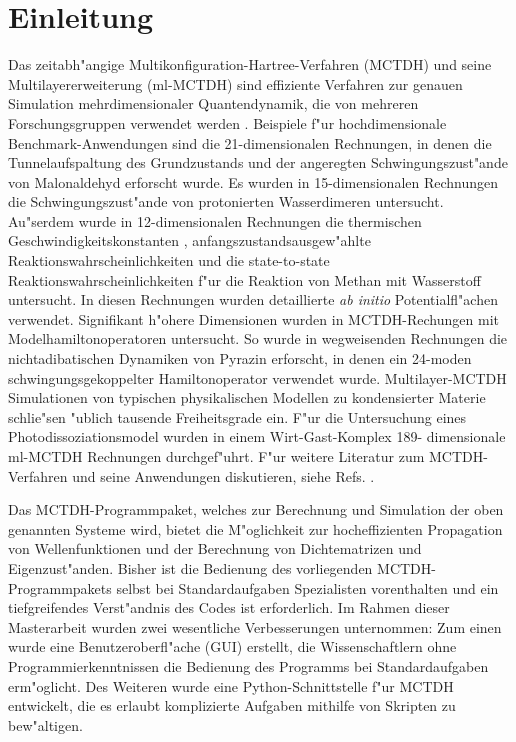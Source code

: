 \chapter{Einleitung}
\label{ch:einleitung}

Das zeitabh"angige Multikonfiguration-Hartree-Verfahren (MCTDH) 
\cite{MMC, MMC1} und seine Multilayererweiterung (ml-MCTDH)
\cite{WT3, Mreview2} 
sind effiziente Verfahren zur genauen Simulation mehrdimensionaler Quantendynamik,
die von mehreren Forschungsgruppen verwendet werden 
\cite{MCTDHex1, WestPNM, MCTDHex2, W1, MCTDHex4, MCTDHex5, MCTDHex6, MCTDHex7, MCTDHex8,
MCTDHex9, MCTDHex10, MCTDHex11, MCTDHex12, MCTDHex13, MCTDHex14, MCTDHex15, MCTDHex16, MCTDHex17,MCTDHex18}. 
Beispiele f"ur hochdimensionale 
Benchmark-Anwendungen sind die 21-dimen\-sio\-nalen Rechnungen, in denen die Tunnelaufspaltung des
Grundzustands \cite{CVM, HCVM, HaM1, MAMCTDH, HaM2, MAMCTDH2} und der angeregten \cite{HCVM, HaM1, MAMCTDH, HaM2, MAMCTDH2}
Schwingungszust"ande von Malonaldehyd erforscht wurde. 
Es wurden in 15-dimen\-sio\-nalen Rechnungen die Schwingungszust"ande von protonierten 
Wasserdimeren \cite{H5O2+MCTDH, H5O2+MCTDH2, H5O2+MCTDH3, H5O2+MCTDH4, H5O2+MCTDH5} untersucht. 
Au"serdem wurde in 12-dimensionalen Rechnungen die thermischen 
Geschwindig\-keitskonstanten \cite{HM1, HM2, WWM, SM, vHNM,NvHM}, anfangszustandsausgew"ahlte Reaktionswahrscheinlichkeiten
\cite{SM02, SM04, WeM5, WeM6, WeM8} und die 
state-to-state Reaktionswahrscheinlichkeiten \cite{WeM7} f"ur die Reaktion von Methan mit Wasserstoff 
untersucht. In diesen Rechnungen wurden detaillierte \textit{ab initio} 
Potentialfl"achen verwendet. Signifikant h"ohere Dimensionen wurden in MCTDH-Rechungen mit 
Modelhamiltonoperatoren untersucht. So wurde in wegweisenden Rechnungen  
die nichtadibatischen Dynamiken von Pyrazin erforscht, in denen ein 24-moden 
schwingungsgekoppelter Hamiltonoperator \cite{WMC, WMC2, RWMC} verwendet wurde.
Multilayer-MCTDH Simulationen von typischen
physikalischen Modellen \cite{WT3, W1, WST, KCBWT, CTW2, WPHT} zu kondensierter Materie schlie"sen "ublich tausende Freiheitsgrade ein.
F"ur die Untersuchung eines Photodissoziationsmodel wurden in einem Wirt-Gast-Komplex 189-
dimensionale ml-MCTDH Rechnungen  durchgef"uhrt\cite{WBRSM}. F"ur weitere Literatur zum MCTDH-Verfahren und
seine Anwendungen diskutieren, siehe Refs. \cite{MCTDHreview, MCTDHreview2, HMreview1, MCTDHbook,Mreview2011, MCTDHreview3}.

Das MCTDH-Programmpaket, welches zur Berechnung und Simulation der oben genannten Systeme wird, bietet die M"oglichkeit
zur hocheffizienten Propagation von Wellenfunktionen und der Berechnung von Dichtematrizen und Eigenzust"anden.
Bisher ist die Bedienung des vorliegenden MCTDH-Programmpakets selbst bei Standardaufgaben Spezialisten vorenthalten und 
ein tiefgreifendes Verst"andnis des Codes ist erforderlich. 
Im Rahmen dieser Masterarbeit wurden zwei wesentliche Verbesserungen unternommen: 
Zum einen wurde eine Benutzeroberfl"ache (GUI) erstellt, die Wissenschaftlern
ohne Programmierkenntnissen die Bedienung des Programms bei Standardaufgaben erm"oglicht.
Des Weiteren wurde eine Python-Schnittstelle f"ur MCTDH entwickelt,
die es erlaubt komplizierte Aufgaben mithilfe von Skripten zu bew"altigen.

